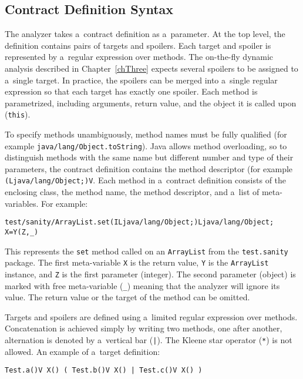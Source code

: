 \subsection{Contract Definition Syntax}

The analyzer takes a~contract definition as a~parameter. At the top level, the
definition contains pairs of targets and spoilers. Each target and spoiler is
represented by a~regular expression over methods. The on-the-fly dynamic
analysis described in Chapter~\ref{chThree} expects several spoilers to be
assigned to a~single target. In practice, the spoilers can be merged into
a~single regular expression so that each target has exactly one spoiler. Each
method is parametrized, including arguments, return value, and the object it is
called upon (\texttt{this}).

To specify methods unambiguously, method names must be fully qualified (for
example \texttt{java/lang/Object.toString}). Java allows method overloading, so
to distinguish methods with the same name but different number and type of their
parameters, the contract definition contains the method descriptor (for example
\texttt{(Ljava/lang/Object;)V}. Each method in a~contract definition consists of
the enclosing class, the method name, the method descriptor, and a~list of
meta-variables. For example:

\begin{lstlisting}
test/sanity/ArrayList.set(ILjava/lang/Object;)Ljava/lang/Object; X=Y(Z,_)
\end{lstlisting}

This represents the \texttt{set} method called on an \texttt{ArrayList} from
the \texttt{test.sanity} package. The first meta-variable \texttt{X} is the
return value, \texttt{Y} is the \texttt{ArrayList} instance, and \texttt{Z} is
the first parameter (integer). The second parameter (object) is marked with free
meta-variable (\texttt{\_}) meaning that the analyzer will ignore its value. The
return value or the target of the method can be omitted.

Targets and spoilers are defined using a~limited regular expression over
methods. Concatenation is achieved simply by writing two methods, one after
another, alternation is denoted by a~vertical bar (\texttt{|}). The Kleene star
operator (\texttt{*}) is not allowed. An example of a~target definition:

\begin{lstlisting}
Test.a()V X() ( Test.b()V X() | Test.c()V X() )
\end{lstlisting}

